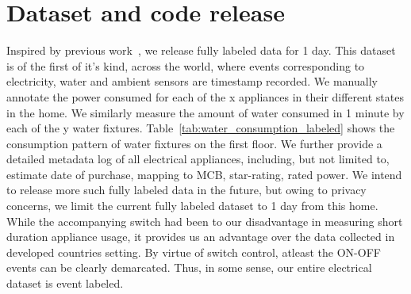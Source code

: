 \documentclass[10pt]{sensys-proc}
\newcommand{\tabref}[1]{Table~\ref{#1}}
\begin{document}
\section{Dataset and code release}
Inspired by previous work~\cite{blued_cmu}, we release fully labeled data for 1 day. This dataset is of the first of it's kind, across the world, where events corresponding to electricity, water and ambient sensors are timestamp recorded. We manually annotate the power consumed for each of the x appliances in their different states in the home. We similarly measure the amount of water consumed in 1 minute by each of the y water fixtures. \tabref{tab:water_consumption_labeled} shows the consumption pattern of water fixtures on the first floor. We further provide a detailed metadata log of all electrical appliances, including, but not limited to, estimate date of purchase, mapping to MCB, star-rating, rated power. We intend to release more such fully labeled data in the future, but owing to privacy concerns, we limit the current fully labeled dataset to 1 day from this home. While the accompanying switch had been to our disadvantage in measuring short duration appliance usage, it provides us an advantage over the data collected in developed countries setting. By virtue of switch control, atleast the ON-OFF events can be clearly demarcated. Thus, in some sense, our entire electrical dataset is event labeled. 
\end{document}
